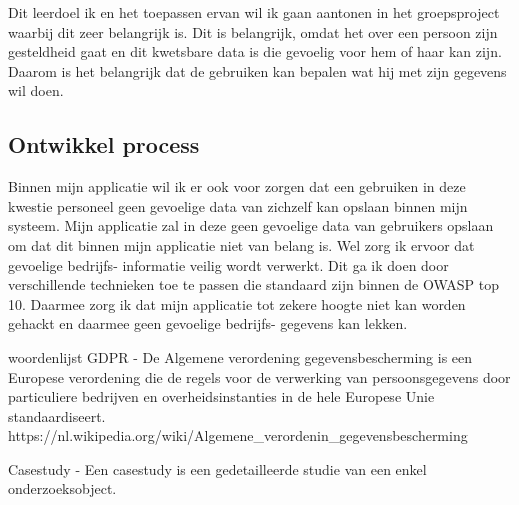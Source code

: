 Dit leerdoel ik en het toepassen ervan wil ik gaan aantonen in het groepsproject waarbij dit zeer belangrijk is.
Dit is belangrijk, omdat het over een persoon zijn gesteldheid gaat en dit kwetsbare data is die gevoelig voor hem of haar kan zijn.
Daarom is het belangrijk dat de gebruiken kan bepalen wat hij met zijn gegevens wil doen.


\subsection{Ontwikkel process}
Binnen mijn applicatie wil ik er ook voor zorgen dat een gebruiken in deze kwestie personeel geen gevoelige data van zichzelf kan opslaan binnen mijn systeem.
Mijn applicatie zal in deze geen gevoelige data van gebruikers opslaan om dat dit binnen mijn applicatie niet van belang is.
Wel zorg ik ervoor dat gevoelige bedrijfs- informatie veilig wordt verwerkt.
Dit ga ik doen door verschillende technieken toe te passen die standaard zijn binnen de OWASP top 10.
Daarmee zorg ik dat mijn applicatie tot zekere hoogte niet kan worden gehackt en daarmee geen gevoelige bedrijfs- gegevens kan lekken.



\newpage
\bigskip
\bigskip
woordenlijst
GDPR - De Algemene verordening gegevensbescherming is een Europese verordening die de regels voor de verwerking van
persoonsgegevens door particuliere bedrijven en overheidsinstanties in de hele Europese Unie standaardiseert.
https://nl.wikipedia.org/wiki/Algemene\_verordenin\_gegevensbescherming

Casestudy -  Een casestudy is een gedetailleerde studie van een enkel onderzoeksobject.


